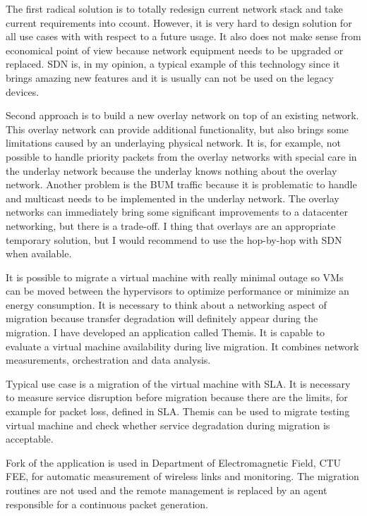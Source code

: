 The first radical solution is to totally redesign current network stack and take current requirements into ccount. However, it is very hard to design solution for all use cases with with respect to a future usage. It also does not make sense from economical point of view because network equipment needs to be upgraded or replaced. \Ac{SDN} is, in my opinion, a typical example of this technology since it brings amazing new features and it is usually can not be used on the legacy devices.

Second approach is to build a new overlay network on top of an existing network. This overlay network can provide additional functionality, but also brings some limitations caused by an underlaying physical network. It is, for example, not possible to handle priority packets from the overlay networks with special care in the underlay network because the underlay knows nothing about the overlay network. Another problem is the \Ac{BUM} traffic because it is problematic to handle and multicast needs to be implemented in the underlay network.
The overlay networks can immediately bring some significant improvements to a datacenter networking, but there is a trade-off. I thing that overlays are an appropriate temporary solution, but I would recommend to use the hop-by-hop with \Ac{SDN} when available.

It is possible to migrate a virtual machine with really minimal outage so \Ac{VM}s can be moved between the hypervisors to optimize performance or minimize an energy consumption. It is necessary to think about a networking aspect of migration because transfer degradation will definitely appear during the migration. I have developed an application called Themis. It is capable to evaluate a virtual machine availability during live migration. It combines network measurements, orchestration and data analysis.

Typical use case is a migration of the virtual machine with \Ac{SLA}. It is necessary to measure service disruption before migration because there are the limits, for example for packet loss, defined in \Ac{SLA}. Themis can be used to migrate testing virtual machine and check whether service degradation during migration is acceptable.

Fork of the application is used in Department of Electromagnetic Field, CTU FEE, for automatic measurement of wireless links and monitoring. The migration routines are not used and the remote management is replaced by an agent responsible for a continuous packet generation.

